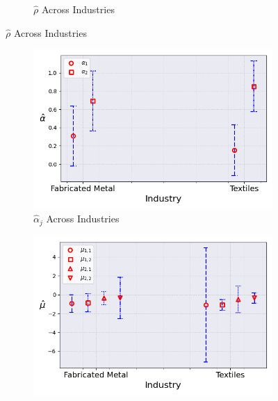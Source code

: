 \documentclass{article}
\begin{document}
\begin{figure}[ht!]
\begin{subfigure}[t]{0.32\textwidth}
        \caption{$\hat\rho$ Across Industries}
    \end{subfigure}
\end{figure}

\begin{figure}[ht!]
    \centering 
    \caption{AR(1) Mixture Model with $\log K$, Import and CIIU Across Industries ($M_0 = 2$)}
    \begin{subfigure}[t]{0.32\textwidth}
        \centering
        \includegraphics[width=\textwidth]{figure/ar1_mixture_kmshare_ciiu_alpha_across_industries_m2.png}
        \caption{$\hat\alpha_j$ Across Industries}
    \end{subfigure}
    \begin{subfigure}[t]{0.32\textwidth}
        \centering
        \includegraphics[width=\textwidth]{figure/ar1_mixture_kmshare_ciiu_mu_across_industries_m2.png}

\end{subfigure}
\end{figure}
\end{document}

